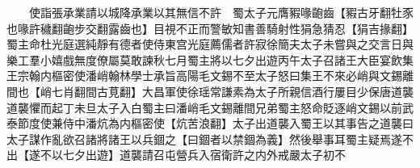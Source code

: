 　　使詣張承業請以城降承業以其無信不許　蜀太子元膺豭喙齙齒【豭古牙翻牡豕也喙許穢翻齙步交翻露齒也】目視不正而警敏知書善騎射性狷急猜忍【狷吉掾翻】蜀主命杜光庭選純靜有德者使侍東宫光庭薦儒者許寂徐簡夫太子未嘗與之交言日與樂工羣小嬉戲無度僚屬莫敢諫秋七月蜀主將以七夕出遊丙午太子召諸王大臣宴飲集王宗翰内樞密使潘峭翰林學士承旨高陽毛文錫不至太子怒曰集王不來必峭與文錫離間也【峭七肖翻間古莧翻】大昌軍使徐瑶常謙素為太子所親信酒行屢目少保唐道襲道襲懼而起丁未旦太子入白蜀主曰潘峭毛文錫離間兄弟蜀主怒命貶逐峭文錫以前武泰節度使兼侍中潘炕為内樞密使【炕苦浪翻】太子出道襲入蜀王以其事告之道襲曰太子謀作亂欲召諸將諸王以兵錮之【曰錮者以禁錮為義】然後舉事耳蜀主疑焉遂不出【遂不以七夕出遊】道襲請召屯營兵入宿衛許之内外戒嚴太子初不